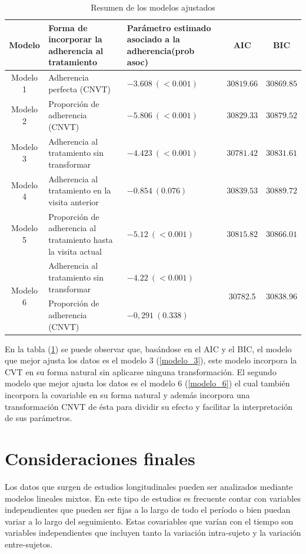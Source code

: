 \documentclass[spanish]{article}
\numberwithin{figure}{subsection}
\numberwithin{equation}{subsection}
\numberwithin{table}{subsection}
\begin{document}
\begin{table}[H]
	\centering
	\caption{Resumen de los modelos ajustados}
	\label{comparacion}
	\begin{tabular}{|c|p{5cm}|p{5cm}|c|c|}
		\hline
		Modelo & Forma de incorporar la adherencia al tratamiento & Parámetro estimado asociado a la adherencia(prob asoc) & AIC & BIC \\
		\hline
		Modelo 1 & Adherencia perfecta (CNVT) & $-3.608\ (<0.001)$ & $30819.66$ & $30869.85$ \\
		\hline
		Modelo 2 & Proporción de adherencia (CNVT) & $-5.806\ (<0.001)$ & $30829.33$ & $30879.52$ \\
		\hline
		Modelo 3 & Adherencia al tratamiento sin transformar & $-4.423\ (<0.001) $ & $30781.42$ & $30831.61$ \\
		\hline
		Modelo 4 & Adherencia al tratamiento en la visita anterior & $-0.854\ (0.076)$ & $30839.53$ & $30889.72$ \\
		\hline
		Modelo 5 & Proporción de adherencia al tratamiento hasta la visita actual & $-5.12\ (<0.001)$ & $30815.82$ & $30866.01$ \\
		\hline
		\multirow{2}{*}{Modelo 6}
		& Adherencia al tratamiento sin transformar & $-4.22\ (<0.001)$ & \multirow{2}{*}{30782.5} & \multirow{2}{*}{30838.96} \\
		\cline{2-3}
		& Proporción de adherencia (CNVT) & $-0,291\ (0.338)$ & & \\
		\hline
	\end{tabular}
\end{table}

En la tabla (\ref{comparacion}) se puede observar que, basándose en el AIC y el
BIC, el modelo que mejor ajusta los datos es el modelo 3 (\ref{modelo_3}), este
modelo incorpora la CVT en su forma natural sin aplicarse ninguna
transformación. El segundo modelo que mejor ajusta los datos es el modelo 6
(\ref{modelo_6}) el cual también incorpora la covariable en su forma natural y
además incorpora una transformación CNVT de ésta para dividir su efecto y
facilitar la interpretación de sus parámetros.

\newpage

\section{Consideraciones finales}

Los datos que surgen de estudios longitudinales pueden ser analizados mediante
modelos lineales mixtos. En este tipo de estudios es frecuente contar con
variables independientes que pueden ser fijas a lo largo de todo el período o
bien puedan variar a lo largo del seguimiento. Estas covariables que varían con
el tiempo son variables independientes que incluyen tanto la variación
intra-sujeto y la variación entre-sujetos.
\end{document}
